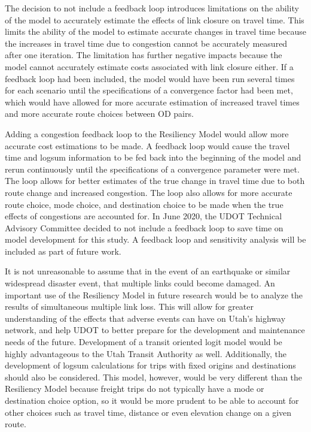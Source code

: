 The decision to not include a feedback loop introduces limitations on the
ability of the model to accurately estimate the effects of link closure on
travel time. This limits the ability of the model to estimate accurate changes in
travel time because the increases in travel time due to congestion cannot be
accurately measured after one iteration. The limitation has further negative
impacts because the model cannot accurately estimate costs associated with link
closure either.
If a feedback loop had been included, the model would have been run several
times for each scenario until the specifications of a convergence factor had
been met, which would have allowed for more accurate estimation of increased
travel times and more accurate route choices between OD pairs.

Adding a congestion feedback loop to the Resiliency Model would allow more
accurate cost estimations to be made. A feedback loop would cause the
travel time and logsum information to be fed back into the beginning of the
model and rerun continuously until the specifications of a convergence
parameter were met. The loop allows for better estimates of the true change
in travel time due to both route change and increased congestion. The loop
also allows for more accurate route choice, mode choice, and destination
choice to be made when the true effects of congestions are accounted for.
In June 2020, the UDOT Technical Advisory Committee decided to not include a
feedback loop to save time
on model development for this study. A feedback loop and sensitivity analysis
will be included as part of future work.

It is not unreasonable to assume that in the event of an earthquake or
similar widespread disaster event, that multiple links could become
damaged. An important use of the Resiliency Model in future research would be
to analyze the results of simultaneous multiple link
loss. This will allow for
greater understanding of the effects that adverse events can have on Utah’s
highway network, and help UDOT to better prepare for the development and
maintenance needs of the future. Development of a transit oriented logit model
would be highly advantageous to the Utah Transit Authority as well.
Additionally, the development of logsum calculations for trips with fixed
origins and destinations should also be considered. This model, however,
would be very different than the Resiliency Model because freight trips
do not typically have a mode or destination choice option, so it would be
more prudent to be able to account for other choices such as travel time,
distance or even elevation change on a given route.


